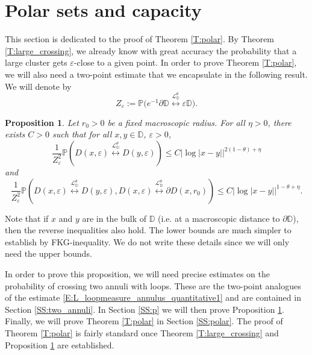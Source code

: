 \documentclass[11pt]{article}
\newtheorem{proposition}[theorem]{Proposition}
\theoremstyle{remark}
\newcommand{\D}{\mathbb{D}}
\newcommand{\Lc}{\mathcal{L}}
\newcommand{\Prob}[1]{\mathbb{P} \left( #1 \right) }
\renewcommand{\P}{\mathbb{P}}
\newcommand{\eps}{\varepsilon}
\numberwithin{equation}{section}
\begin{document}
\section{Polar sets and capacity}

This section is dedicated to the proof of Theorem  \ref{T:polar}. By Theorem \ref{T:large_crossing}, we already know with great accuracy the probability that a large cluster gets $\eps$-close to a given point. In order to prove Theorem \ref{T:polar}, we will also need a two-point estimate that we encapsulate in the following result. We will denote by
\begin{equation}
Z_\eps := \P \Big( e^{-1} \partial \D \overset{\Lc_\D^\theta}{\longleftrightarrow} \eps \D  \Big).
\end{equation}

\begin{proposition}\label{P:two-point}
Let $r_0 > 0$ be a fixed macroscopic radius.
For all $\eta>0$, there exists $C>0$ such that for all $x, y \in \D$, $\eps >0$,
\begin{equation}
\label{E:p1}
\frac{1}{Z_\eps^2} \Prob{ D(x,\eps) \overset{\Lc_\D^\theta}{\longleftrightarrow} D(y,\eps) } \leq C |\log |x-y||^{2(1-\theta) + \eta}
\end{equation}
and
\begin{equation}
\label{E:p2}
\frac{1}{Z_\eps^2} \Prob{ D(x,\eps) \overset{\Lc_\D^\theta}{\longleftrightarrow} D(y,\eps), D(x,\eps) \overset{\Lc_\D^\theta}{\longleftrightarrow} \partial D(x,r_0) }
\leq C |\log |x-y||^{1-\theta + \eta}.
\end{equation}
\end{proposition}

Note that if $x$ and $y$ are in the bulk of $\D$ (i.e. at a macroscopic distance to $\partial \D$), then the reverse inequalities also hold. The lower bounds are much simpler to establish by FKG-inequality. We do not write these details since we will only need the upper bounds.

In order to prove this proposition, we will need precise estimates on the probability of crossing two annuli with loops. These are the two-point analogues of the estimate \eqref{E:L_loopmeasure_annulus_quantitative1} and are contained in Section \ref{SS:two_annuli}. In Section \ref{SS:p} we will then prove Proposition \ref{P:two-point}. Finally, we will prove Theorem \ref{T:polar} in Section \ref{SS:polar}. The proof of Theorem \ref{T:polar} is fairly standard once Theorem \ref{T:large_crossing} and Proposition \ref{P:two-point} are established.
\end{document}
